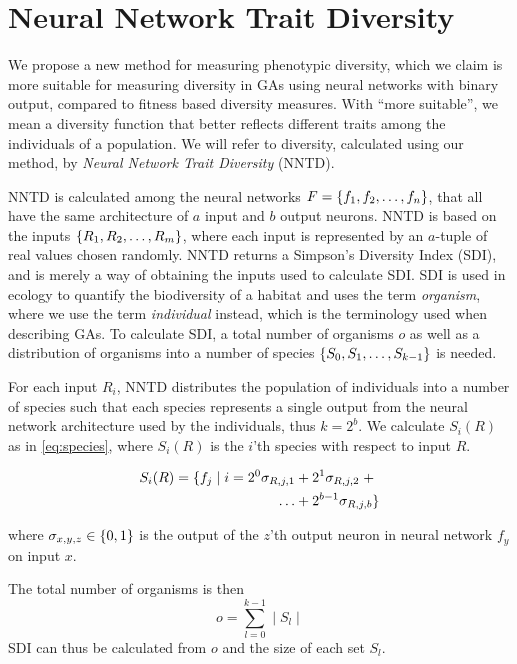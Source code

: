 \section{Neural Network Trait Diversity}
We propose a new method for measuring phenotypic diversity, which we claim is more suitable for measuring diversity in GAs using neural networks with binary output, compared to fitness based diversity measures. With ``more suitable'', we mean a diversity function that better reflects different traits among the individuals of a population. We will refer to diversity, calculated using our method, by \emph{Neural Network Trait Diversity} (NNTD).

NNTD is calculated among the neural networks $F = \{ f_1, f_2, \dots, f_n \}$, that all have the same architecture of $a$ input and $b$ output neurons. NNTD is based on the inputs $\{ R_1, R_2, \dots, R_m \}$, where each input is represented by an $a$-tuple of real values chosen randomly. NNTD returns a Simpson's Diversity Index (SDI), and is merely a way of obtaining the inputs used to calculate SDI\@. SDI is used in ecology to quantify the biodiversity of a habitat and uses the term \emph{organism}, where we use the term \emph{individual} instead, which is the terminology used when describing GAs. To calculate SDI, a total number of organisms $o$ as well as a distribution of organisms into a number of species $\{ S_0, S_1, \dots, S_{k-1} \}$ is needed.

For each input $R_i$, NNTD distributes the population of individuals into a number of species such that each species represents a single output from the neural network architecture used by the individuals, thus $k = 2^b$. We calculate $S_i(R)$ as in \cref{eq:species}, where $S_i(R)$ is the $i$'th species with respect to input $R$.


\begin{equation}\label{eq:species}
  \begin{split}
    S_i(R) = \{ f_j \mid i = 2^0\sigma_{R,j,1} & + 2^1\sigma_{R,j,2}\; + \\
  \dots & + 2^{b-1}\sigma_{R,j,b} \}
  \end{split}
\end{equation}

where $\sigma_{x,y,z} \in \{ 0, 1 \}$ is the output of the $z$'th output neuron in neural network $f_y$ on input $x$.

The total number of organisms is then
%
\[
  o = \sum\limits_{l = 0}^{k-1} \mid S_l \mid
\]
%
SDI can thus be calculated from $o$ and the size of each set $S_l$.

